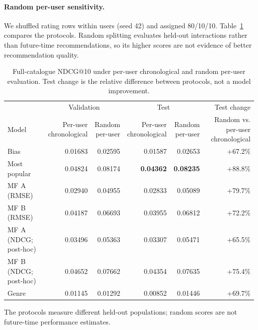 \documentclass{article}
\begin{document}
\paragraph{Random per-user sensitivity.}
We shuffled rating rows within users (seed 42) and assigned 80/10/10.
Table~\ref{tab:split_sensitivity} compares the protocols. Random splitting
evaluates held-out interactions rather than future-time recommendations, so
its higher scores are not evidence of better recommendation quality.
\begin{table}[t]
\centering
\caption{Full-catalogue NDCG@10 under per-user chronological and random
per-user evaluation. Test change is the relative difference between
protocols, not a model improvement.}
\label{tab:split_sensitivity}
\small
\begin{tabular}{lrrrrr}
\toprule
& \multicolumn{2}{c}{Validation} & \multicolumn{2}{c}{Test} & Test change\\
Model & \shortstack{Per-user\\chronological} & \shortstack{Random\\per-user}
& \shortstack{Per-user\\chronological} & \shortstack{Random\\per-user}
& \shortstack{Random vs.\\per-user chronological}\\
\midrule
Bias & 0.01683 & 0.02595 & 0.01587 & 0.02653 & +67.2\%\\
Most popular & 0.04824 & 0.08174 & \textbf{0.04362} & \textbf{0.08235} & +88.8\%\\
MF A (RMSE) & 0.02940 & 0.04955 & 0.02833 & 0.05089 &  +79.7\%\\
MF B (RMSE) & 0.04187 & 0.06693 & 0.03955 & 0.06812 & +72.2\%\\
MF A (NDCG; post-hoc) & 0.03496 & 0.05363 & 0.03307 & 0.05471 & +65.5\%\\
MF B (NDCG; post-hoc) & 0.04652 & 0.07662 & 0.04354 & 0.07635 & +75.4\%\\
Genre & 0.01145 & 0.01292 & 0.00852 & 0.01446 & +69.7\%\\
\bottomrule
\end{tabular}
\end{table}
The protocols measure different held-out populations; random scores are not
future-time performance estimates.
\end{document}
